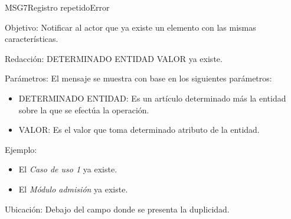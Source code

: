 \begin{mensaje}{MSG7}{Registro repetido}{Error}
	\item [Objetivo:] Notificar al actor que ya existe un elemento con las mismas características.
	\item[Redacción:] DETERMINADO ENTIDAD VALOR ya existe.
	\item[Parámetros:] El mensaje se muestra con base en los siguientes parámetros:
		\begin{itemize}
 			\item DETERMINADO ENTIDAD: Es un artículo determinado más la entidad sobre la que se efectúa la operación.
 			\item VALOR: Es el valor que toma determinado atributo de la entidad.
		\end{itemize}
	\item[Ejemplo:] \begin{itemize}
		\item El {\em Caso de uso 1} ya existe.
		\item El {\em Módulo admisión} ya existe.
	\end{itemize}
	\item [Ubicación:] Debajo del campo donde se presenta la duplicidad.
\end{mensaje}